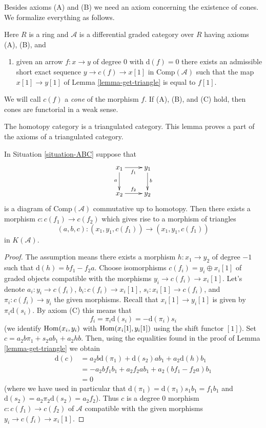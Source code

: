 \noindent
Besides axioms (A) and (B) we need an axiom concerning the existence of
cones. We formalize everything as follows.

\begin{situation}
\label{situation-ABC}
Here $R$ is a ring and $\mathcal{A}$ is a differential graded category
over $R$ having axioms (A), (B), and
\begin{enumerate}
\item[(C)] given an arrow $f : x \to y$ of degree $0$ with
$\text{d}(f) = 0$ there exists an admissible short exact sequence
$y \to c(f) \to x[1]$ in $\text{Comp}(\mathcal{A})$ such that the map
$x[1] \to y[1]$ of Lemma \ref{lemma-get-triangle} is equal to $f[1]$.
\end{enumerate}
\end{situation}

\noindent
We will call $c(f)$ a {\it cone} of the morphism $f$.
If (A), (B), and (C) hold, then
cones are functorial in a weak sense.

\begin{lemma}
\label{lemma-cone}
\begin{slogan}
The homotopy category is a triangulated category.
This lemma proves a part of the axioms of a triangulated category.
\end{slogan}
In Situation \ref{situation-ABC} suppose that
$$
\xymatrix{
x_1 \ar[r]_{f_1} \ar[d]_a & y_1 \ar[d]^b \\
x_2 \ar[r]^{f_2} & y_2
}
$$
is a diagram of $\text{Comp}(\mathcal{A})$ commutative up to homotopy.
Then there exists a morphism $c : c(f_1) \to c(f_2)$ which gives rise to
a morphism of triangles
$$
(a, b, c) : (x_1, y_1, c(f_1)) \to (x_1, y_1, c(f_1))
$$
in $K(\mathcal{A})$.
\end{lemma}

\begin{proof}
The assumption means there exists a morphism $h : x_1 \to y_2$ of degree
$-1$ such that $\text{d}(h) = b f_1 - f_2 a$. Choose isomorphisms
$c(f_i) = y_i \oplus x_i[1]$ of graded objects compatible with the
morphisms $y_i \to c(f_i) \to x_i[1]$. Let's denote
$a_i : y_i \to c(f_i)$, $b_i : c(f_i) \to x_i[1]$, $s_i : x_i[1] \to c(f_i)$,
and $\pi_i : c(f_i) \to y_i$ the given morphisms. Recall that
$x_i[1] \to y_i[1]$ is given by $\pi_i \text{d}(s_i)$. By axiom (C)
this means that
$$
f_i = \pi_i \text{d}(s_i) = - \text{d}(\pi_i) s_i
$$
(we identify $\mathop{\mathrm{Hom}}\nolimits(x_i, y_i)$ with $\mathop{\mathrm{Hom}}\nolimits(x_i[1], y_i[1])$
using the shift functor $[1]$).
Set $c = a_2 b \pi_1 + s_2 a b_1 + a_2hb$. Then, using the
equalities found in the proof of Lemma \ref{lemma-get-triangle}
we obtain
\begin{align*}
\text{d}(c)
& =
a_2 b \text{d}(\pi_1) + \text{d}(s_2) a b_1 + a_2 \text{d}(h) b_1 \\
& =
- a_2 b f_1 b_1 + a_2 f_2 a b_1 + a_2 (b f_1 - f_2 a) b_1 \\
& = 0
\end{align*}
(where we have used in particular that
$\text{d}(\pi_1) = \text{d}(\pi_1) s_1 b_1 = f_1 b_1$ and
$\text{d}(s_2) = a_2 \pi_2 \text{d}(s_2) = a_2 f_2$).
Thus $c$ is a degree $0$ morphism $c : c(f_1) \to c(f_2)$ of $\mathcal{A}$
compatible with the given morphisms $y_i \to c(f_i) \to x_i[1]$.
\end{proof}

